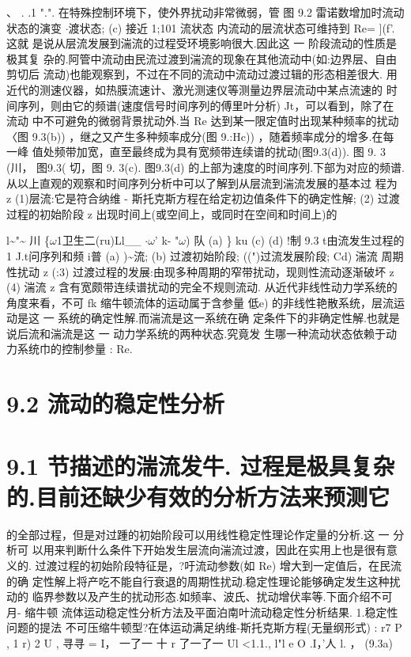 、 . .1 ".". 在特殊控制环境下，使外界扰动非常微弱，管 图 9.2 雷诺数增加时流动状态的演变 $\cdot $渡状态; (c) 接近 1;101 流状态 内流动的层流状态可维持到 Re= ](f'. 这就 是说从层流发展到湍流的过程受环境影响很大.因此这 一 阶段流动的性质是极其复 杂的.阿管中流动由民流过渡到湍流的现象在其他流动中(如:边界层、自由剪切后 流动)也能观察到，不过在不同的流动中流动过渡过辑的形态相差很大. 用近代的测速仪器，如热膜流速计、激光测速仪等测量边界层流动中某点流速的 时间序列，则由它的频谱(速度信号时间序列的傅里叶分析) Jt，可以看到，除了在流动 中不可避免的微弱背景扰动外.当 Re 达到某一限定值时出现某种频率的扰动 〈图 9.3(b)) ，继之又产生多种频率成分(图 9.:Hc)) ，随着频率成分的增多.在每一峰 值处频带加宽，直至最终成为具有宽频带连续谱的扰动(图9.3(d)). 图 9. 3 (川， 图9.3( 切，图 9. 3(c). 图9.3(d) 的上部为速度的时间序列.下部为对应的频谱. 从以上直观的观察和时间序列分析中可以了解到从层流到湍流发展的基本过 程为 z (1)层流:它是符合纳维 - 斯托克斯方程在给定初边值条件下的确定性解; (2) 过渡过程的初始阶段 z 出现时间上(或空间上，或同时在空间和时间上)的

l\textasciitilde{}"\textasciitilde{} 川 \{$\omega$1卫生二(ru)Ll\_\_ $\cdot $$\omega$' k- "$\omega$) 队 (a) \} ku (c) (d) !制 9.3 t由流发生过程的 1 J.t问序列和频 i普 (a) )\textasciitilde{}流; (b) 过渡初始阶段; ((")过流发展阶段; Cd) 湍流 周期性扰动 z (:3) 过渡过程的发展:由现多种周期的窄带扰动，现则性流动逐渐破坏 z (4) 湍流 z 含有宽颇带连续谱扰动的完全不规则流动. 从近代非线性动力学系统的角度来看，不可 fk 缩牛顿流体的运动属于含参量 低e) 的非线性艳散系统，层流运动是这 一 系统的确定性解.而湍流是这一系统在确 定条件下的非确定性解.也就是说后流和湍流是这 一 动力学系统的两种状态.究竟发 生哪一种流动状态依赖于动力系统巾的控制参量 : Re.

\section*{9.2  流动的稳定性分析}

\section*{9.1  节描述的湍流发牛. 过程是极具复杂的.目前还缺少有效的分析方法来预测它}

的全部过程，但是对过踵的初始阶段可以用线性稳定性理论作定量的分析.这 一 分析可 以用来判断什么条件下开始发生层流向湍流过渡，因此在实用上也是很有意义的. 过渡过程的初始阶段特征是，?吁流动参数(如 Re) 增大到一定值后，在民流的确 定性解上将产吃不能自行衰退的周期性扰动.稳定性理论能够确定发生这种扰动的 临界参数以及产生的扰动形态.如频率、波氏、扰动增伏率等.下面介绍不可月- 缩牛顿 流体运动稳定性分析方法及平面泊南叶流动稳定性分析结果. 1.稳定性问题的提法 不可压缩牛顿型?在体运动满足纳维-斯托克斯方程(无量纲形式) : r7 P , 1 r) 2 U , 寻寻 = I， 一了一 十 r 了一了一 Ul <1.1., l"l e O .I，'人 l. ， (9.3a)

